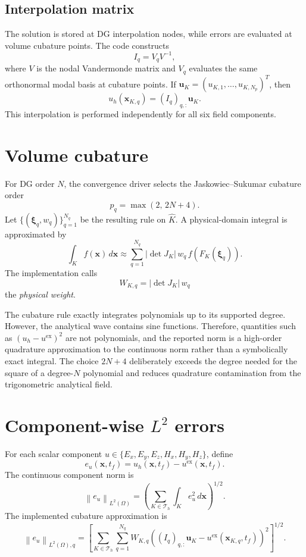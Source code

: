 \documentclass[11pt]{article}
\newcommand{\vect}[1]{\boldsymbol{#1}}
\newcommand{\norm}[1]{\left\lVert #1 \right\rVert}
\newcommand{\abs}[1]{\left| #1 \right|}
\begin{document}
\subsection{Interpolation matrix}

The solution is stored at DG interpolation nodes, while errors are evaluated
at volume cubature points. The code constructs
\[
  I_q=V_qV^{-1},
\]
where \(V\) is the nodal Vandermonde matrix and \(V_q\) evaluates the same
orthonormal modal basis at cubature points. If
\(\vect u_K=(u_{K,1},\ldots,u_{K,N_p})^T\), then
\[
  u_h(\vect x_{K,q})=(I_q)_{q,:}\vect u_K.
\]
This interpolation is performed independently for all six field components.

\section{Volume cubature}

For DG order \(N\), the convergence driver selects the
Jaskowiec--Sukumar cubature order
\[
  p_q=\max(2,\,2N+4).
\]
Let \(\{(\vect \xi_q,w_q)\}_{q=1}^{N_q}\) be the resulting rule on
\(\widehat K\). A physical-domain integral is approximated by
\[
  \int_K f(\vect x)\,d\vect x
  \approx
  \sum_{q=1}^{N_q}
    \abs{\det J_K}\,w_q\,f(F_K(\vect \xi_q)).
\]
The implementation calls
\[
  W_{K,q}=\abs{\det J_K}\,w_q
\]
the \emph{physical weight}.

The cubature rule exactly integrates polynomials up to its supported degree.
However, the analytical wave contains sine functions. Therefore,
quantities such as
\((u_h-u^{\mathrm{ex}})^2\) are not polynomials, and the reported norm is a
high-order quadrature approximation to the continuous norm rather than a
symbolically exact integral. The choice \(2N+4\) deliberately exceeds the
degree needed for the square of a degree-\(N\) polynomial and reduces
quadrature contamination from the trigonometric analytical field.

\section{\texorpdfstring{Component-wise \(L^2\) errors}{Component-wise L2 errors}}

For each scalar component \(u\in
\{E_x,E_y,E_z,H_x,H_y,H_z\}\), define
\[
  e_u(\vect x,t_f)=u_h(\vect x,t_f)-u^{\mathrm{ex}}(\vect x,t_f).
\]
The continuous component norm is
\[
  \norm{e_u}_{L^2(\Omega)}
  =
  \left(
    \sum_{K\in\mathcal{T}_h}
    \int_K e_u^2\,d\vect x
  \right)^{1/2}.
\]
The implemented cubature approximation is
\[
  \norm{e_u}_{L^2(\Omega),q}
  =
  \left[
    \sum_{K\in\mathcal{T}_h}
    \sum_{q=1}^{N_q}
    W_{K,q}
    \left(
      (I_q)_{q,:}\vect u_K
      -
      u^{\mathrm{ex}}(\vect x_{K,q},t_f)
    \right)^2
  \right]^{1/2}.
\]
\end{document}
